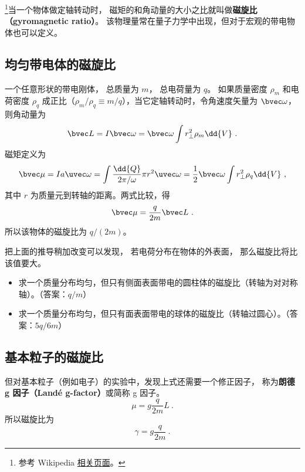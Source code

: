 


\footnote{参考 Wikipedia \href{https://en.wikipedia.org/wiki/Gyromagnetic_ratio}{相关页面}。}当一个物体做定轴转动时， 磁矩的和角动量的大小之比就叫做\textbf{磁旋比（gyromagnetic ratio）}。 该物理量常在量子力学中出现，但对于宏观的带电物体也可以定义。

\subsection{均匀带电体的磁旋比}
一个任意形状的带电刚体， 总质量为 $m$， 总电荷量为 $q$。 如果质量密度 $\rho_m$ 和电荷密度 $\rho_q$ 成正比（$\rho_m/\rho_q \equiv m/q$），当它定轴转动时，令角速度矢量为 $\bvec\omega$， 则角动量为
\begin{equation}
\bvec L = I\bvec \omega  = \bvec \omega \int r_\bot^2 \rho_m \dd{V}~.
\end{equation}
磁矩定义为
\begin{equation}
\bvec \mu  = Ia \uvec\omega = \int \frac{\dd{Q}}{2\pi/\omega}  \pi r^2 \uvec \omega
= \frac12 \bvec \omega \int r_\bot^2\rho_q \dd{V} ~,
\end{equation}
其中 $r$ 为质量元到转轴的距离。两式比较，得
\begin{equation}
\bvec \mu  = \frac{q}{2m} \bvec L~.
\end{equation}
所以该物体的磁旋比为 $q/(2m)$。

把上面的推导稍加改变可以发现， 若电荷分布在物体的外表面， 那么磁旋比将比该值要大。
\begin{exercise}{}
\begin{itemize}
\item 求一个质量分布均匀，但只有侧面表面带电的圆柱体的磁旋比（转轴为对对称轴）。（答案：$q/m$）
\item 求一个质量分布均匀，但只有面表面带电的球体的磁旋比（转轴过圆心）。（答案：$5q/6m$）
\end{itemize}
\end{exercise}

\subsection{基本粒子的磁旋比}
但对基本粒子（例如电子）的实验中，发现上式还需要一个修正因子， 称为\textbf{朗德 g 因子（Landé g-factor）}或简称 g 因子。
\begin{equation}\label{eq_BohMag_4}
\mu  = g\frac{q}{2m} L~.
\end{equation}
所以磁旋比为
\begin{equation}
\gamma  = g\frac{q}{2m}~.
\end{equation}

